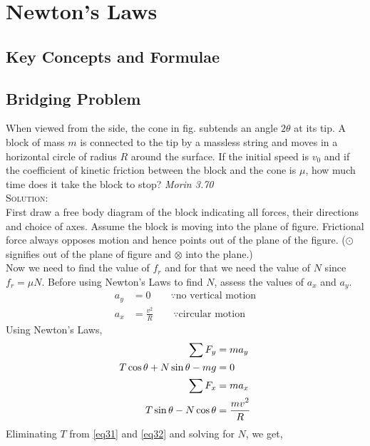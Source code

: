 \chapter{Newton's Laws}

\pagestyle{fancy}
\fancyhf{}
\fancyhead[OC]{\leftmark}
\fancyhead[EC]{\rightmark}
\cfoot{\thepage}

\section{Key Concepts and Formulae}

\section{Bridging Problem}
When viewed from the side, the cone in fig. subtends an angle $2\theta$ at its tip. A block of mass $m$ is connected to the tip by a massless string and moves in a horizontal circle of radius $R$ around the surface. If the initial speed is $v_0$ and if the coefficient of kinetic friction between the block and the cone is $\mu$, how much time does it take the block to stop? \hfill \textit{Morin 3.70}\\
\textsc{Solution:}\\
First draw a free body diagram of the block indicating all forces, their directions and choice of axes. Assume the block is moving into the plane of figure. Frictional force always opposes motion and hence points out of the plane of the figure. ($\odot$ signifies out of the plane of figure and $\otimes$ into the plane.)\\
Now we need to find the value of $f_r$ and for that we need the value of $N$ since $f_r=\mu N$. Before using Newton's Laws to find $N$, assess the values of $a_x$ and $a_y$.
\begin{align*}
a_y&=0 \qquad \because\text{no vertical motion}\\
a_x&=\frac{v^2}{R} \qquad \because\text{circular motion}
\end{align*}
Using Newton's Laws,
\begin{align}
 \sum F_y&=ma_y \nonumber\\
T\cos\theta + N\sin\theta - mg&=0 \label{eq31}\\
\sum F_x &= ma_x \nonumber\\
T\sin\theta - N\cos\theta &= \frac{\displaystyle mv^2}{\displaystyle R}\label{eq32}
\end{align}
Eliminating $T$ from \eqref{eq31} and \eqref{eq32} and solving for $N$, we get,
